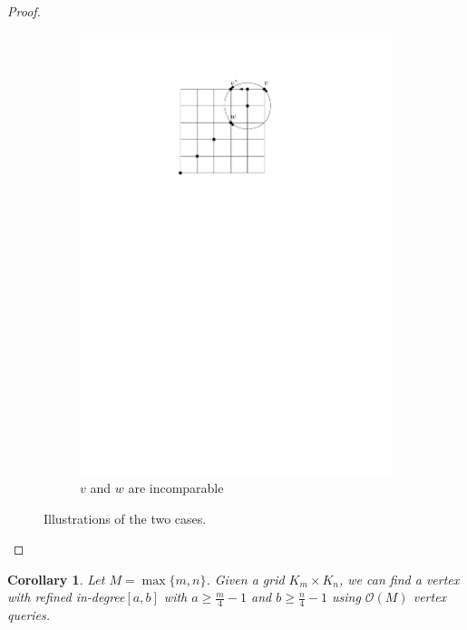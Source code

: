 \documentclass[a4paper,10pt]{article}
\newtheorem{corollary}{Corollary}
\newcommand{\indegree}{refined in-degree\xspace}
\begin{document}
\begin{proof}
\begin{figure}[htbp]
\begin{subfigure}[b]{0.4\textwidth}
           \includegraphics[scale = 0.7]{seedlemma_fig2_cas2.pdf}
           \caption{$v$ and $w$ are incomparable}
       \end{subfigure}
       \caption{Illustrations of the two cases. }
       \label{fig:seedlem2}
   \end{figure}
\end{proof}

\begin{corollary}\label{corollary: n/4 indegree}
 Let $M = \max\{m,n\}$. Given a grid $K_{m} \times K_{n}$, we can find a vertex with \indegree $[a,b]$ with $a \geq \frac{m}{4} - 1$ and  $b \geq \frac{n}{4} - 1$ using $\mathcal{O}(M)$ vertex queries.
\end{corollary}
\end{document}
